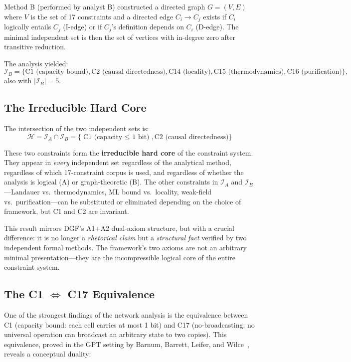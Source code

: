 \documentclass[12pt,a4paper]{article}
\theoremstyle{definition}
\theoremstyle{remark}
\begin{document}
Method B (performed by analyst B) constructed a directed graph $G=(V,E)$ where $V$ is the set of 17 constraints and a directed edge $C_i \to C_j$ exists if $C_i$ logically entails $C_j$ (I-edge) or if $C_j$'s definition depends on $C_i$ (D-edge). The minimal independent set is then the set of vertices with in-degree zero after transitive reduction.

The analysis yielded:
\begin{equation}
\mathcal{I}_B = \{\text{C1 (capacity bound)}, \text{C2 (causal directedness)}, \text{C14 (locality)}, \text{C15 (thermodynamics)}, \text{C16 (purification)}\},
\end{equation}
also with $|\mathcal{I}_B| = 5$.

\subsection{The Irreducible Hard Core}

The intersection of the two independent sets is:
\begin{equation}
\boxed{\mathcal{H} = \mathcal{I}_A \cap \mathcal{I}_B = \{\text{C1 (capacity $\leq$ 1 bit)}, \text{C2 (causal directedness)}\}}
\end{equation}

These two constraints form the \textbf{irreducible hard core} of the constraint system. They appear in \emph{every} independent set regardless of the analytical method, regardless of which 17-constraint corpus is used, and regardless of whether the analysis is logical (A) or graph-theoretic (B). The other constraints in $\mathcal{I}_A$ and $\mathcal{I}_B$---Landauer vs.\ thermodynamics, ML bound vs.\ locality, weak-field vs.\ purification---can be substituted or eliminated depending on the choice of framework, but C1 and C2 are invariant.

This result mirrors DGF's A1+A2 dual-axiom structure, but with a crucial difference: it is no longer a \emph{rhetorical claim} but a \emph{structural fact} verified by two independent formal methods. The framework's two axioms are not an arbitrary minimal presentation---they are the incompressible logical core of the entire constraint system.

\subsection{The C1 $\Leftrightarrow$ C17 Equivalence}

One of the strongest findings of the network analysis is the equivalence between C1 (capacity bound: each cell carries at most 1 bit) and C17 (no-broadcasting: no universal operation can broadcast an arbitrary state to two copies). This equivalence, proved in the GPT setting by Barnum, Barrett, Leifer, and Wilce~\cite{Barnum2007}, reveals a conceptual duality:
\end{document}
